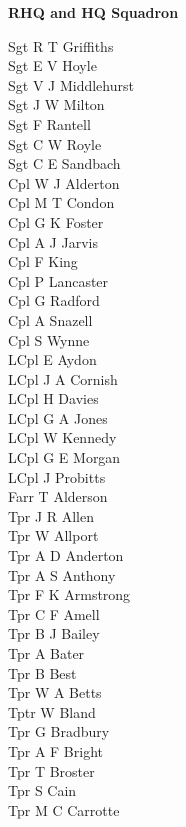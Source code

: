 \begin{center}
  \Large
  \textbf{RHQ and HQ Squadron}
\end{center}

\begin{multicols}{2}
  \noindent
  Sgt R T Griffiths \\
  Sgt E V Hoyle \\
  Sgt V J Middlehurst \\
  Sgt J W Milton \\
  Sgt F Rantell \\
  Sgt C W Royle \\
  Sgt C E Sandbach \\
  Cpl W J Alderton \\
  Cpl M T Condon \\
  Cpl G K Foster \\
  Cpl A J Jarvis \\
  Cpl F King \\
  Cpl P Lancaster \\
  Cpl G Radford \\
  Cpl A Snazell \\
  Cpl S Wynne \\
  LCpl E Aydon \\
  LCpl J A Cornish \\
  LCpl H Davies \\
  LCpl G A Jones \\
  LCpl W Kennedy \\
  LCpl G E Morgan \\
  LCpl J Probitts \\
  Farr T Alderson \\
  Tpr J R Allen \\
  Tpr W Allport \\
  Tpr A D Anderton \\
  Tpr A S Anthony \\
  Tpr F K Armstrong \\
  Tpr C F Amell \\
  Tpr B J Bailey \\
  Tpr A Bater \\
  Tpr B Best \\
  Tpr W A Betts \\
  Tptr W Bland \\
  Tpr G Bradbury \\
  Tpr A F Bright \\
  Tpr T Broster \\
  Tpr S Cain \\
  Tpr M C Carrotte \\

\end{multicols}
